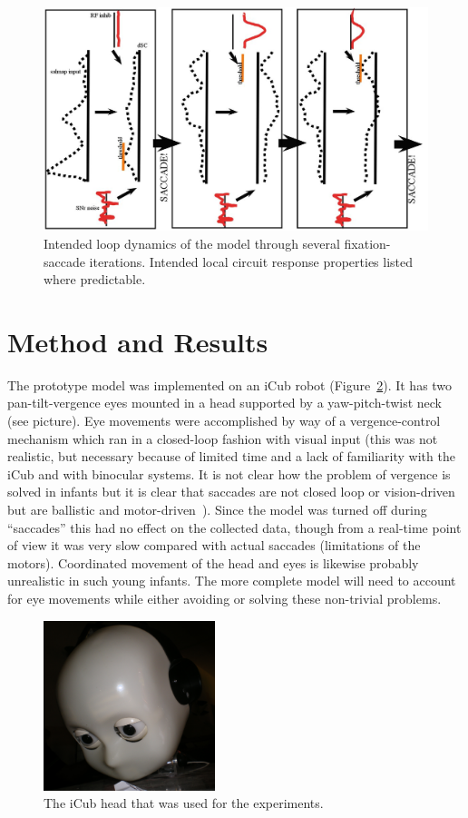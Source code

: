 \documentclass[12pt]{article}
\begin{document}
\begin{figure} [!t]
\centering
\includegraphics[width=15.0cm]{looking_functional_loop.jpg}
\caption{Intended loop dynamics of the model through several
  fixation-saccade iterations. Intended local circuit response
  properties listed where predictable.}
\label{fig:looking_functional_loop}
\end{figure}


\section{Method and Results}
The prototype model was implemented on an iCub robot
(Figure~\ref{fig:icub_head}). It has two pan-tilt-vergence eyes
mounted in a head supported by a yaw-pitch-twist neck (see
picture). Eye movements were accomplished by way of a vergence-control
mechanism which ran in a closed-loop fashion with visual input (this
was not realistic, but necessary because of limited time and a lack of
familiarity with the iCub and with binocular systems. It is not clear
how the problem of vergence is solved in infants but it is clear that
saccades are not closed loop or vision-driven but are ballistic and
motor-driven~\cite{hainline_1998}). Since the model was turned off
during ``saccades'' this had no effect on the collected data, though
from a real-time point of view it was very slow compared with actual
saccades (limitations of the motors). Coordinated movement of the head
and eyes is likewise probably unrealistic in such young infants. The
more complete model will need to account for eye movements while
either avoiding or solving these non-trivial problems.

\begin{figure} [!t]
\centering
\includegraphics[width=5.0cm]{icub_head.jpg}
\caption{The iCub head that was used for the experiments.}
\label{fig:icub_head}
\end{figure}
\end{document}
